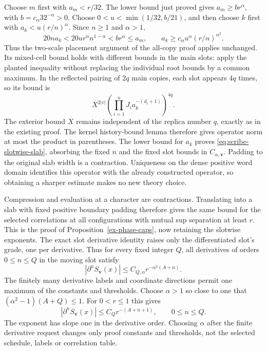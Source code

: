 Choose $m$ first with $a_m<r/32$. The lower bound just proved gives
$a_m\ge b r^\alpha$, with $b=c_\alpha32^{-\alpha}>0$.
Choose $0<u<\min(1/32,b/21)$, and then choose $k$ first with
$a_k<u(r/n)^\alpha$. Since $n\ge1$ and $\alpha>1$,
\[
 20na_k<20u r^\alpha n^{1-\alpha}<b r^\alpha\le a_m,
 \qquad
 a_k\ge c_\alpha u^\alpha(r/n)^{\alpha^2}.
\]
Thus the two-scale placement argument of the all-copy proof applies
unchanged. Its mixed-cell bound holds with different bounds in the
main slots: apply the planted inequality without replacing the
individual root bounds by a common maximum. In the reflected pairing
of $2q$ main copies, each slot appears $4q$ times, so its bound is
\[
 X^{2|v|}\left(\prod_{i=1}^n
                   J_i a_k^{-(d_i+1)}\right)^{4q}.
\]
The exterior bound $X$ remains independent of the replica number $q$,
exactly as in the existing proof. The kernel history-bound lemma therefore gives
operator norm at most the product in parentheses. The lower bound for
$a_k$ proves \eqref{eq:scribe-slotwise-slab}, absorbing the fixed $n$
and the fixed slot bounds in $C_{\alpha,\boldsymbol v}$. Padding to the
original slab width is a contraction. Uniqueness on the dense positive
word domain identifies this operator with the already constructed
operator, so obtaining a sharper estimate makes no new theory choice.

Compression and evaluation at a character are contractions. Translating
into a slab with fixed positive boundary padding therefore gives the
same bound for the selected correlations at all configurations with
mutual sup separation at least $r$. This is the proof of
Proposition~\ref{ex-phase-caps}, now retaining the slotwise exponents.
The exact slot derivative identity raises only the differentiated
slot's grade, one per derivative. Thus for every fixed integer $Q$,
all derivatives of orders $0\le n\le Q$ in the moving slot satisfy
\[
 |\partial^n S_{\boldsymbol v}(x)|
      \le C_{Q,\alpha} r^{-\alpha^2(A+n)}.
\]
The finitely many derivative labels and coordinate directions permit
one maximum of the constants and thresholds. Choose $\alpha>1$ so
close to one that $(\alpha^2-1)(A+Q)\le1$. For $0<r\le1$ this gives
\begin{equation}\label{eq:scribe-linear-derivative-price}
 |\partial^n S_{\boldsymbol v}(x)|
                 \le C_Q r^{-(A+n+1)},\qquad 0\le n\le Q.
\end{equation}
The exponent has slope one in the derivative order. Choosing $\alpha$
after the finite derivative request changes only proof constants and
thresholds, not the selected schedule, labels or correlation table.

